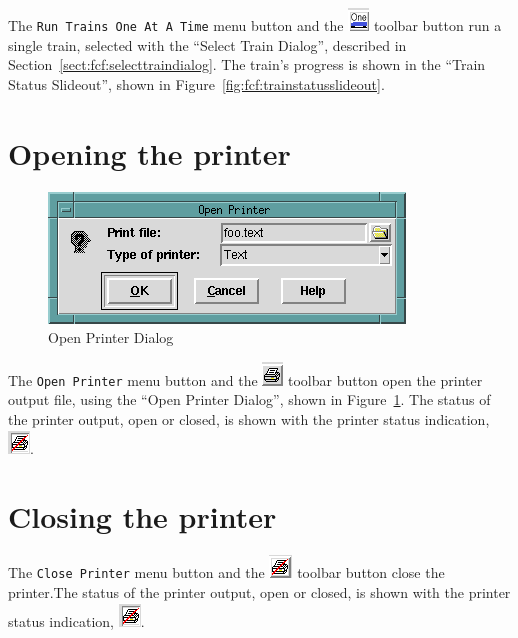 The \verb=Run Trains One At A Time= menu button and the
\includegraphics{FCFRun1TrTool.png} toolbar button run a single train,
selected with the ``Select Train Dialog'', described in
Section~\ref{sect:fcf:selecttraindialog}. The train's progress is shown
in the ``Train Status Slideout'', shown in
Figure~\ref{fig:fcf:trainstatusslideout}.


\section{Opening the printer}

\begin{figure}[hbpt]
\begin{centering}
\includegraphics{FCFOpenPrinterDialog.png}
\caption{Open Printer Dialog}
\label{fig:fcf:openprinterdialog}
\end{centering}
\end{figure}
The \verb=Open Printer= menu button and the
\includegraphics{FCFOpenPrinterTool.png} toolbar button open the printer
output file, using the ``Open Printer Dialog'', shown in
Figure~\ref{fig:fcf:openprinterdialog}. The status of the printer
output, open or closed, is shown with the printer status indication,
\includegraphics{FCFPrinterInd.png}.

\section{Closing the printer}

The \verb=Close Printer= menu button and the
\includegraphics{FCFClosePrinterTool.png} toolbar button close the
printer.The status of the printer output, open or closed, is shown with
the printer status indication, \includegraphics{FCFPrinterInd.png}.

